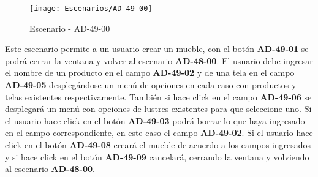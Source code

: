\begin{figure}[H]
\centering
\texttt{[image: Escenarios/AD-49-00]}
\caption{Escenario - AD-49-00}
\label{fig:AD-49-00}
\end{figure}

Este escenario permite a un usuario crear un mueble, con el botón \textbf{AD-49-01} se podrá cerrar la ventana y volver al escenario \textbf{AD-48-00}.
El usuario debe ingresar el nombre de un producto en el campo \textbf{AD-49-02} y de una tela en el campo \textbf{AD-49-05} desplegándose un menú de opciones en cada caso con productos y telas existentes respectivamente. También si hace click en el campo \textbf{AD-49-06} se desplegará un menú con opciones de lustres existentes para que seleccione uno. 
Si el usuario hace click en el botón \textbf{AD-49-03} podrá borrar lo que haya ingresado en el campo correspondiente, en este caso el campo \textbf{AD-49-02}. 
Si el usuario hace click en el botón \textbf{AD-49-08} creará el mueble de acuerdo a los campos ingresados y si hace click en el botón \textbf{AD-49-09} cancelará, cerrando la ventana y volviendo al escenario \textbf{AD-48-00}.
\clearpage
